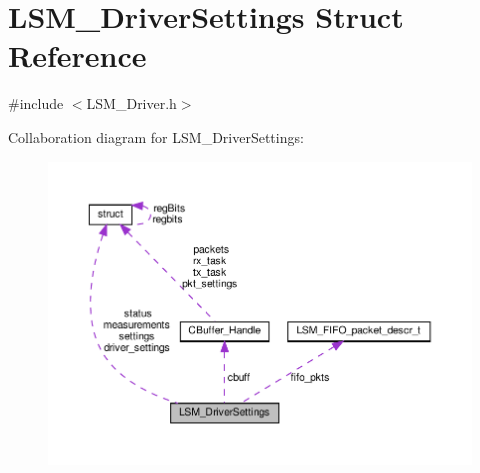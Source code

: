 \hypertarget{structLSM__DriverSettings}{}\section{L\+S\+M\+\_\+\+Driver\+Settings Struct Reference}
\label{structLSM__DriverSettings}


{\ttfamily \#include $<$L\+S\+M\+\_\+\+Driver.\+h$>$}



Collaboration diagram for L\+S\+M\+\_\+\+Driver\+Settings\+:\nopagebreak
\begin{figure}[H]
\begin{center}
\leavevmode
\includegraphics[width=350pt]{structLSM__DriverSettings__coll__graph}
\end{center}
\end{figure}
